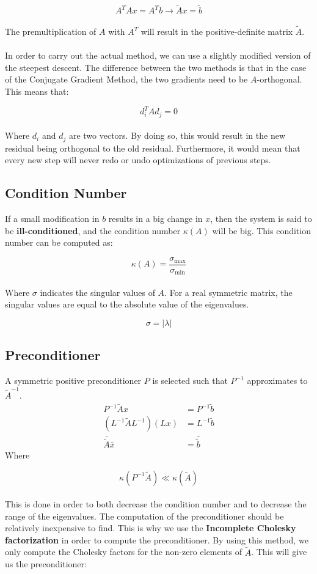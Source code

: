 \documentclass{article}
\begin{document}
\[ A^TAx = A^Tb \rightarrow \tilde{A}x = \tilde{b} \] \\
The premultiplication of $A$ with $A^T$ will result in the positive-definite matrix $\tilde{A}$. \\ \\
In order to carry out the actual method, we can use a slightly modified version of the steepest descent. The difference between the two methods is that in the case of the Conjugate Gradient Method, the two gradients need to be $A$-orthogonal. This means that:

\[ d^T_i A d_j = 0 \] \\
Where $d_i$ and $d_j$ are two vectors. By doing so, this would result in the new residual being orthogonal to the old residual. Furthermore, it would mean that every new step will never redo or undo optimizations of previous steps.

\subsection{Condition Number}
If a small modification in $b$ results in a big change in $x$, then the system is said to be \textbf{ill-conditioned}, and the condition number $\kappa(A)$ will be big. This condition number can be computed as:

\[ \kappa(A) = \frac{\sigma_{\max}}{\sigma_{\min}} \] \\
Where $\sigma$ indicates the singular values of $A$. For a real symmetric matrix, the singular values are equal to the absolute value of the eigenvalues.

\[ \sigma = |\lambda| \]

\subsection{Preconditioner}
A symmetric positive preconditioner $P$ is selected such that $P^{-1}$ approximates to $\tilde{A}^{-1}$.
\begin{align*}
	P^{-1}\tilde{A}x & = P^{-1}\tilde{b} \\
	(L^{-1}\tilde{A}L^{-1})(Lx) & = L^{-1}\tilde{b} \\
	\bar{\tilde{A}}\bar{x} & = \bar{\tilde{b}}
\end{align*}
Where

\[ \kappa(P^{-1}\tilde{A}) \ll \kappa(\tilde{A}) \]\\
This is done in order to both decrease the condition number and to decrease the range of the eigenvalues.
The computation of the preconditioner should be relatively inexpensive to find. This is why we use the \textbf{Incomplete Cholesky factorization} in order to compute the preconditioner. By using this method, we only compute the Cholesky factors for the non-zero elements of $\tilde{A}$. This will give us the preconditioner:
\end{document}
